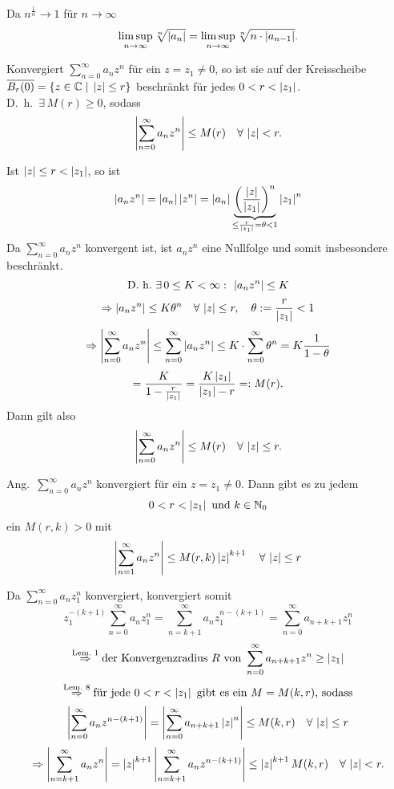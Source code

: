 \documentclass[../ana1.tex]{subfiles}
\begin{document}
\begin{bew}
    Da \( n^{\frac{1}{n}} \rightarrow 1 \) für \( n\rightarrow \infty \)
    \[ \limsup\limits_{n\rightarrow\infty} \sqrt[n]{\left|a_n\right|} = \limsup\limits_{n\rightarrow\infty} \sqrt[n]{n \cdot \left|a_{n-1}\right|}. \]
\end{bew}
\begin{lem}
    Konvergiert \( \sum_{n=0}^\infty a_n z^n \) für ein \( z = z_1 \neq 0 \), 
    so ist sie auf der Kreisscheibe \( \overline{B_r (0)}  = \{ z\in\mathbb{C} \;\vert \; \left|z\right|\leq r \} \)
    beschränkt für jedes \( 0 < r < \left|z_1\right| \).\\
    D.\ h.\  \( \exists \, M(r) \geq 0 \), sodass
    \[ \left| \sum_{n=0}^\infty a_n z^n \right| \leq M(r) \quad \forall \, \left|z\right| < r. \]
\end{lem}
\begin{bew}
    Ist \( \left|z\right| \leq r < \left|z_1\right| \), so ist
    \[ \left|a_n z^n\right| = \left|a_n\right| \left|z^n\right| = \left|a_n\right| \underbrace{ {\left( \frac{\left|z\right|}{\left|z_1\right|} \right)}^n }_{\leq \frac{r}{\left|z_1\right|} = \theta < 1} \left|z_1\right|^n \]
    Da \( \sum_{n=0}^\infty a_n z^n \) konvergent ist, ist \( a_n z^n \) eine Nullfolge und somit insbesondere beschränkt.
    \[\text{D.\ h.\ } \exists \, 0 \leq K < \infty \,\colon \, \left|a_n z^n\right| \leq K \]
    \[ \Rightarrow \left|a_n z^n\right| \leq K \theta^n \quad \forall \, \left|z\right|\leq r, \quad \theta := \frac{r}{\left|z_1\right|} < 1 \]
    \[ \Rightarrow \left| \sum_{n=0}^\infty a_n z^n \right| \leq \sum_{n=0}^\infty \left|a_n z^n\right| \leq K \cdot \sum_{n=0}^\infty \theta^n = K \frac{1}{1 - \theta} \]
    \[ = \frac{K}{1 - \frac{r}{\left|z_1\right|}} = \frac{ K \left|z_1\right| }{\left|z_1\right| - r} =: M(r). \]
    Dann gilt also
    \[ \left| \sum_{n=0}^\infty a_n z^n \right| \leq M(r) \quad \forall \, \left|z\right| \leq r. \]
\end{bew}
\begin{kor}
    Ang.\  \( \sum_{n=0}^\infty a_n z^n \) konvergiert für ein \( z = z_1 \neq 0 \). Dann gibt es zu jedem
    \[ 0 < r < \left|z_1\right| \text{ und } k\in\mathbb{N}_0\]
    ein \( M(r,k) > 0 \) mit
    \[ \left| \sum_{n=1}^\infty a_n z^n \right| \leq M(r,k) \left|z\right|^{k+1} \quad \forall \, \left|z\right|\leq r \]
\end{kor}
\begin{bew}
    Da \( \sum_{n=0}^\infty a_n z_1^n \) konvergiert, konvergiert somit
    \[ z_1^{\minus(k+1)} \sum_{n=0}^\infty a_n z_1^n = \sum_{n=k+1}^\infty a_n z_1^{n-(k+1)} = \sum_{n=0}^\infty a_{n+k+1} z_1^n \]
    \[ \overset{\text{Lem.\ 1}}{\Rightarrow} \text{der Konvergenzradius } R \text{ von } \sum_{n=0}^\infty a_{n+k+1} z^n \geq \left|z_1\right| \]
    \[ \overset{\text{Lem.\ 8}}{\Rightarrow} \text{für jede } 0 < r < \left|z_1\right| \text{ gibt es ein } M = M(k,r) \text{, sodass} \]
    \[ \left| \sum_{n=0}^\infty a_n z^{n-(k+1)} \right| = \left| \sum_{n=0}^\infty a_{n+k+1} \left|z\right|^n \right| \leq M(k,r) \quad \forall \, \left|z\right| \leq r \]
    \[ \Rightarrow \left| \sum_{n=k+1}^\infty a_n z^n \right| = \left|z\right|^{k+1} \left| \sum_{n=k+1}^\infty a_n z^{n-(k+1)} \right| \leq \left|z\right|^{k+1} M(k,r) \quad \forall \, \left|z\right| < r. \]
\end{bew}
\end{document}
